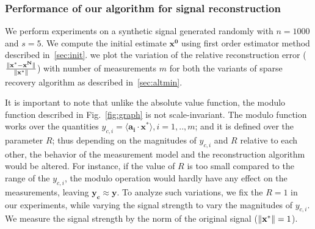 
\subsubsection{Performance of our algorithm for signal reconstruction}
We perform experiments on a synthetic signal generated randomly with $n=1000$ and $s=5$. We compute the initial estimate $\mathbf{x^0}$ using first order estimator method described in~\ref{sec:init}. we plot the variation of the relative reconstruction error ($\frac{\|\mathbf{x^*-x^N}\|}{\|\mathbf{x^*}\|}$) with number of measurements $m$ for both the variants of sparse recovery algorithm as described in~\ref{sec:altmin}.

It is important to note that unlike the absolute value function, the modulo function described in Fig.~\ref{fig:graph} is not scale-invariant. The modulo function works over the quantities $y_{c,i}=\langle \mathbf{a_i} \cdot \mathbf{x^*} \rangle, i=1,..,m$; and it is defined over the parameter $R$; thus depending on the magnitudes of $y_{c,i}$ and $R$ relative to each other, the behavior of the measurement model and the reconstruction algorithm would be altered. For instance, if the value of $R$ is too small compared to the range of the $y_{c,i}$, the modulo operation would hardly have any effect on the measurements, leaving $\mathbf{y_c \approx y}$. To analyze such variations, we fix the $R =1$ in our experiments, while varying the signal strength to vary the magnitudes of $y_{c,i}$. We measure the signal strength by the norm of the original signal ($\|\mathbf{{x}^*}\|=1$).

